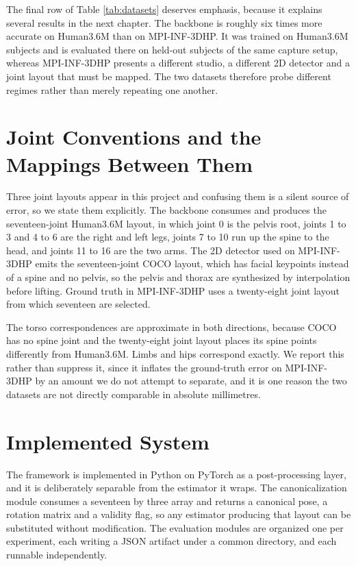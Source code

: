 \documentclass[12pt,a4paper]{report}
\begin{document}
The final row of Table \ref{tab:datasets} deserves emphasis, because it explains several results in the next chapter. The backbone is roughly six times more accurate on Human3.6M than on MPI-INF-3DHP. It was trained on Human3.6M subjects and is evaluated there on held-out subjects of the same capture setup, whereas MPI-INF-3DHP presents a different studio, a different 2D detector and a joint layout that must be mapped. The two datasets therefore probe different regimes rather than merely repeating one another.

\section{Joint Conventions and the Mappings Between Them}

Three joint layouts appear in this project and confusing them is a silent source of error, so we state them explicitly. The backbone consumes and produces the seventeen-joint Human3.6M layout, in which joint 0 is the pelvis root, joints 1 to 3 and 4 to 6 are the right and left legs, joints 7 to 10 run up the spine to the head, and joints 11 to 16 are the two arms. The 2D detector used on MPI-INF-3DHP emits the seventeen-joint COCO layout, which has facial keypoints instead of a spine and no pelvis, so the pelvis and thorax are synthesized by interpolation before lifting. Ground truth in MPI-INF-3DHP uses a twenty-eight joint layout from which seventeen are selected.

The torso correspondences are approximate in both directions, because COCO has no spine joint and the twenty-eight joint layout places its spine points differently from Human3.6M. Limbs and hips correspond exactly. We report this rather than suppress it, since it inflates the ground-truth error on MPI-INF-3DHP by an amount we do not attempt to separate, and it is one reason the two datasets are not directly comparable in absolute millimetres.

\section{Implemented System}

The framework is implemented in Python on PyTorch as a post-processing layer, and it is deliberately separable from the estimator it wraps. The canonicalization module consumes a seventeen by three array and returns a canonical pose, a rotation matrix and a validity flag, so any estimator producing that layout can be substituted without modification. The evaluation modules are organized one per experiment, each writing a JSON artifact under a common directory, and each runnable independently.
\end{document}
